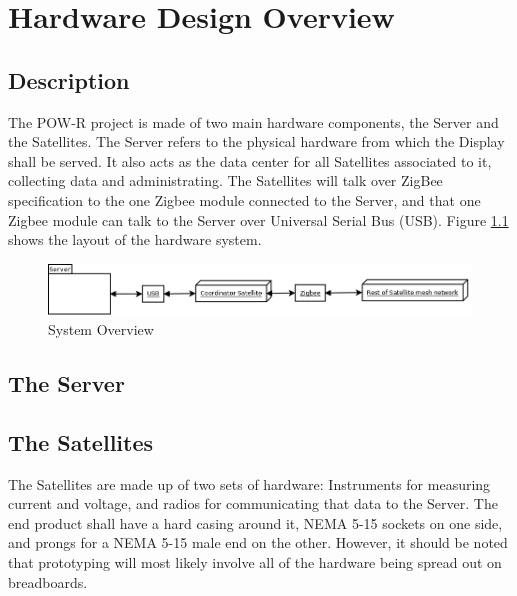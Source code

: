 
\chapter{Hardware Design Overview}

\section{Description}

The POW-R project is made of two main hardware components, the Server and the Satellites. The Server refers to the physical hardware from which the Display shall be served. It also acts as the data center for all Satellites associated to it, collecting data and administrating. The Satellites will talk over ZigBee specification to the one Zigbee module connected to the Server, and that one Zigbee module can talk to the Server over Universal Serial Bus (USB). Figure \ref{SystemOverview} shows the layout of the hardware system.


\begin{figure}[H]
\centering
\includegraphics[scale=0.3]{Hardware/images/SystemOverview.png}
\caption{System Overview}
\label{SystemOverview}
\end{figure}

\section{The Server}




\section{The Satellites}
The Satellites are made up of two sets of hardware: Instruments for measuring current and voltage, and radios for communicating that data to the Server. The end product shall have a hard casing around it, NEMA 5-15 sockets on one side, and prongs for a NEMA 5-15 male end on the other. However, it should be noted that prototyping will most likely involve all of the hardware being spread out on breadboards.


